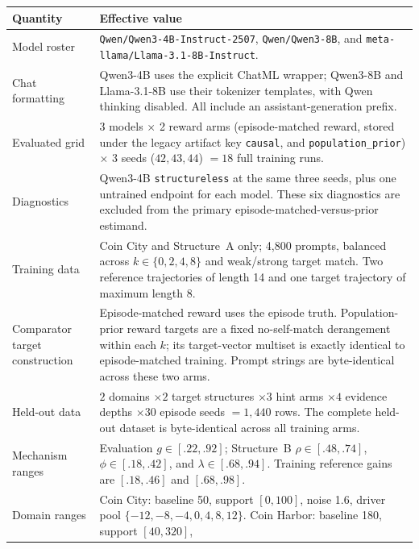 \begin{center}
\begin{minipage}{\linewidth}
\centering
{}
\label{tab:exp3-coin-structural-hparams}
\scriptsize
\setlength{\tabcolsep}{3pt}
\begin{tabular}{p{.29\linewidth}p{.66\linewidth}}
\toprule
\textbf{Quantity} & \textbf{Effective value} \\
\midrule
Model roster & \texttt{Qwen/Qwen3-4B-Instruct-2507},
\texttt{Qwen/Qwen3-8B}, and \texttt{meta-llama/Llama-3.1-8B-Instruct}. \\
Chat formatting & Qwen3-4B uses the explicit ChatML wrapper; Qwen3-8B and
Llama-3.1-8B use their tokenizer templates, with Qwen thinking disabled. All
include an assistant-generation prefix. \\
Evaluated grid & 3 models $\times$ 2 reward arms
(episode-matched reward, stored under the legacy artifact key \texttt{causal}, and \texttt{population\_prior}) $\times$ 3 seeds
($42,43,44$) $=18$ full training runs. \\
Diagnostics & Qwen3-4B \texttt{structureless} at the same three seeds, plus one
untrained endpoint for each model. These six diagnostics are excluded from the primary
episode-matched-versus-prior estimand. \\
Training data & Coin City and Structure~A only; 4,800 prompts, balanced across
$k\in\{0,2,4,8\}$ and weak/strong target match. Two reference trajectories of
length 14 and one target trajectory of maximum length 8. \\
Comparator target construction & Episode-matched reward uses the episode truth.
Population-prior reward targets are a fixed no-self-match derangement within
each $k$; its target-vector multiset is exactly identical to episode-matched training.
Prompt strings are byte-identical across these two arms. \\
Held-out data & $2$ domains $\times2$ target structures $\times3$ hint arms
$\times4$ evidence depths $\times30$ episode seeds $=1,440$ rows. The complete
held-out dataset is byte-identical across all training arms. \\
Mechanism ranges & Evaluation $g\in[.22,.92]$; Structure~B
$\rho\in[.48,.74]$, $\phi\in[.18,.42]$, and $\lambda\in[.68,.94]$.
Training reference gains are $[.18,.46]$ and $[.68,.98]$. \\
Domain ranges & Coin City: baseline 50, support $[0,100]$, noise 1.6, driver
pool $\{-12,-8,-4,0,4,8,12\}$. Coin Harbor: baseline 180, support $[40,320]$,

\end{tabular}
\end{minipage}
\end{center}
